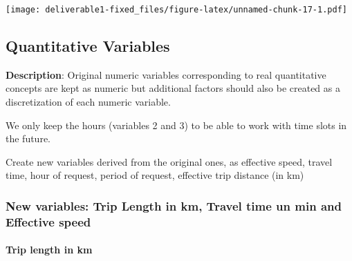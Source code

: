 \documentclass[
  18pt,
  a4paper]{article}
\newenvironment{Shaded}{\begin{snugshade}}{\end{snugshade}}
\newcommand{\CommentTok}[1]{\textcolor[rgb]{0.56,0.35,0.01}{\textit{#1}}}
\newcommand{\DataTypeTok}[1]{\textcolor[rgb]{0.13,0.29,0.53}{#1}}
\newcommand{\KeywordTok}[1]{\textcolor[rgb]{0.13,0.29,0.53}{\textbf{#1}}}
\newcommand{\NormalTok}[1]{#1}
\newcommand{\OperatorTok}[1]{\textcolor[rgb]{0.81,0.36,0.00}{\textbf{#1}}}
\newcommand{\StringTok}[1]{\textcolor[rgb]{0.31,0.60,0.02}{#1}}
\begin{document}
\begin{Shaded}
\end{Shaded}

\texttt{[image: deliverable1-fixed\_files/figure-latex/unnamed-chunk-17-1.pdf]}

\begin{Shaded}
\end{Shaded}

\hypertarget{quantitative-variables}{%
\subsection{Quantitative Variables}\label{quantitative-variables}}

\textbf{Description}: Original numeric variables corresponding to real
quantitative concepts are kept as numeric but additional factors should
also be created as a discretization of each numeric variable.

We only keep the hours (variables 2 and 3) to be able to work with time
slots in the future.

Create new variables derived from the original ones, as effective speed,
travel time, hour of request, period of request, effective trip distance
(in km)

\hypertarget{new-variables-trip-length-in-km-travel-time-un-min-and-effective-speed}{%
\subsubsection{New variables: Trip Length in km, Travel time un min and
Effective
speed}\label{new-variables-trip-length-in-km-travel-time-un-min-and-effective-speed}}

\hypertarget{trip-length-in-km}{%
\paragraph{Trip length in km}\label{trip-length-in-km}}
\end{document}
